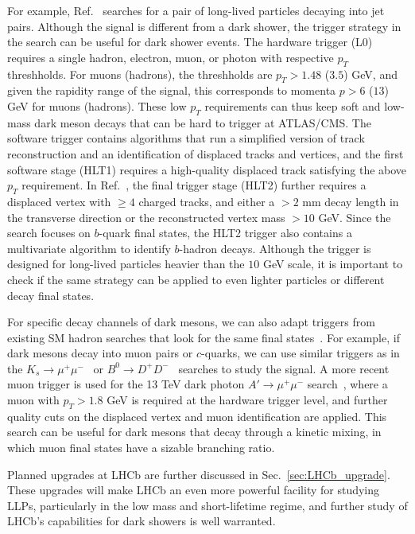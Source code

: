 \begin{enumerate}
For example, Ref.~\cite{Aaij:2014nma} searches for a pair of long-lived particles decaying into jet pairs. Although the signal is different from a dark shower, the trigger strategy in the search can be useful for dark shower events. The hardware trigger (L0) requires a single hadron, electron, muon, or photon with respective $p_T$ threshholds. For muons (hadrons), the threshholds are $p_T>1.48$ ($3.5$) GeV, and given the rapidity range of the signal, this corresponds to momenta $p> 6$ ($13$) GeV for muons (hadrons). These low $p_T$ requirements can thus keep soft and low-mass dark meson decays that can be hard to trigger at ATLAS/CMS. The software trigger contains algorithms that run a simplified version of track reconstruction and an identification of displaced tracks and vertices, and the first software stage (HLT1) requires a high-quality displaced track satisfying the above $p_T$ requirement. In Ref.~\cite{Aaij:2014nma}, the final trigger stage (HLT2) further requires a displaced vertex with $\geq 4$ charged tracks, and either a $>2$ mm decay length in the transverse direction or the reconstructed vertex mass $>10$ GeV. Since the search focuses on $b$-quark final states, the HLT2 trigger also contains a multivariate algorithm to identify $b$-hadron decays. Although the trigger is designed for long-lived particles heavier than the $10$ GeV scale, it is important to check if the same strategy can be applied to even lighter particles or different decay final states.

For specific decay channels of dark mesons, we can also adapt triggers from  existing SM hadron searches that look for the same  final states~\cite{Pierce:2017taw}. For example, if dark mesons decay into muon pairs or $c$-quarks, we can use similar triggers as in the $K_s\to\mu^+\mu^-$~\cite{Aaij:2012rt} or $B^0\to D^+D^-$~\cite{Aaij:2016yip} searches to study the signal. A more recent muon trigger is used for the 13 TeV dark photon $A'\to\mu^+\mu^-$ search~\cite{Aaij:2017rft}, where a muon with $p_T>1.8$ GeV is required at the hardware trigger level, and further quality cuts on the displaced vertex and muon identification are applied. This search can be useful for dark mesons that decay through a kinetic mixing, in which muon final states have a sizable branching ratio.

Planned upgrades at LHCb are further discussed in Sec.~\ref{sec:LHCb_upgrade}.   These upgrades will make LHCb an even more powerful facility for studying LLPs, particularly in the low mass and short-lifetime regime, and further study of LHCb's capabilities for dark showers is well warranted.


\end{enumerate}
